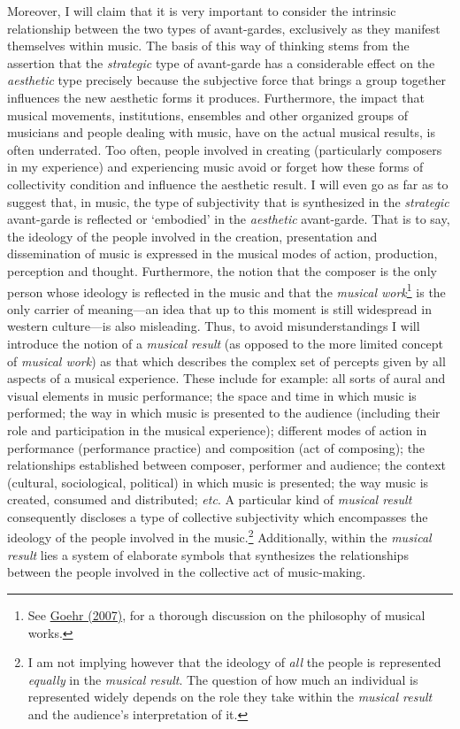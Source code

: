 Moreover, I will claim that it is very important to consider the intrinsic relationship between the two types of avant-gardes, exclusively as they manifest themselves within music. The basis of this way of thinking stems from the assertion that the \emph{strategic} type of avant-garde has a considerable effect on the \emph{aesthetic} type precisely because the subjective force that brings a group together influences the new aesthetic forms it produces. Furthermore, the impact that musical movements, institutions, ensembles and other organized groups of musicians and people dealing with music, have on the actual musical results, is often underrated. Too often, people involved in creating (particularly composers in my experience) and experiencing music avoid or forget how these forms of collectivity condition and influence the aesthetic result. I will even go as far as to suggest that, in music, the type of subjectivity that is synthesized in the \emph{strategic} avant-garde is reflected or `embodied' in the \emph{aesthetic} avant-garde. That is to say, the ideology of the people involved in the creation, presentation and dissemination of music is expressed in the musical modes of action, production, perception and thought. Furthermore, the notion that the composer is the only person whose ideology is reflected in the music and that the \emph{musical work}\footnote{See \hyperlink{goer}{Goehr (2007)}, for a thorough discussion on the philosophy of musical works.} is the only carrier of meaning---an idea that up to this moment is still widespread in western culture---is also misleading. Thus, to avoid misunderstandings I will introduce the notion of a \emph{musical result} (as opposed to the more limited concept of \emph{musical work}) as that which describes the complex set of percepts given by all aspects of a musical experience. These include for example: all sorts of aural and visual elements in music performance; the space and time in which music is performed; the way in which music is presented to the audience (including their role and participation in the musical experience); different modes of action in performance (performance practice) and composition (act of composing); the relationships established between composer, performer and audience; the context (cultural, sociological, political) in which music is presented; the way music is created, consumed and distributed; \emph{etc}. A particular kind of \emph{musical result} consequently discloses a type of collective subjectivity which encompasses the ideology of the people involved in the music.\footnote{I am not implying however that the ideology of \emph{all} the people is represented \emph{equally} in the \emph{musical result}. The question of how much an individual is represented widely depends on the role they take within the \emph{musical result} and the audience's interpretation of it.} Additionally, within the \emph{musical result} lies a system of elaborate symbols that synthesizes the relationships between the people involved in the collective act of music-making.

